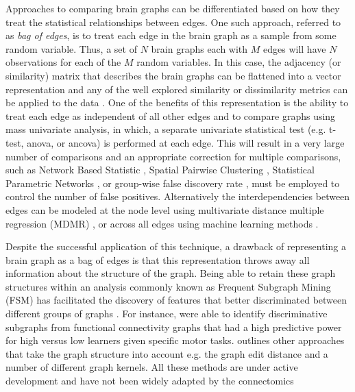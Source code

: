 Approaches to comparing brain graphs can be differentiated based on how they
treat the statistical relationships between edges. One such approach, referred
to as \emph{bag of edges}, is to treat each edge in the brain graph as a sample
from some random variable. Thus, a set of $N$ brain graphs each with $M$ edges
will have $N$ observations for each of the $M$ random variables. In this case,
the adjacency (or similarity) matrix that describes the brain graphs can be
flattened into a vector representation and any of the well explored similarity
or dissimilarity metrics can be applied to the data \cite{Ravindran}. One of
the benefits of this representation is the ability to treat each edge as
independent of all other edges and to compare graphs using mass univariate
analysis, in which, a separate univariate statistical test (e.g. t-test, anova,
or ancova) is performed at each edge. This will result in a very large number
of comparisons and an appropriate correction for multiple comparisons, such as
Network Based Statistic \cite{Zalesky2011}, Spatial Pairwise Clustering
\cite{Zalesky2012}, Statistical Parametric Networks \cite{Ginestet2013}, or
group-wise false discovery rate \cite{}, must be employed to control the number
of false positives. Alternatively the interdependencies between edges can be
modeled at the node level using multivariate distance multiple regression
(MDMR) \cite{Shehzad2014}, or across all edges using machine learning methods
\cite{Craddock2009, Dosenbach2010, Richiardi2011}.


 Despite the successful
application of this technique, a drawback of representing a brain graph as a
bag of edges is that this representation throws away all information about the
structure of the graph. Being able to
retain these graph structures within an analysis commonly known as Frequent
Subgraph Mining (FSM) has facilitated the discovery of features that better
discriminated between different groups of graphs \cite{Harrison2013}. For
instance, \cite{Bogdanov2014} were able to identify discriminative subgraphs
from functional connectivity graphs that had a high predictive power for high
versus low learners given specific motor tasks. \cite{Richiardi2013} outlines
other approaches that take the graph structure into account e.g. the graph edit
distance and a number of different graph kernels. All these methods are under
active development and have not been widely adapted by the connectomics

